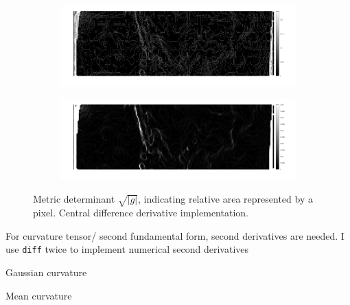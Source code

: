 \documentclass[10pt,a4paper]{article}
\begin{document}
\begin{figure}
\begin{subfigure}{\textwidth}
\centering
\includegraphics[width=\textwidth]{435_sqrtg.png}
\end{subfigure}
\begin{subfigure}{\textwidth}
\includegraphics[width=\textwidth]{435_sqrtg_smooth5.png}
\end{subfigure}
\caption{Metric determinant $\sqrt{|g|}$, indicating relative area represented by a pixel.  Central difference derivative implementation.}
\end{figure}

For curvature tensor/ second fundamental form, second derivatives are needed.  I use \texttt{diff} twice to implement numerical second derivatives

Gaussian curvature

Mean curvature
\end{document}
